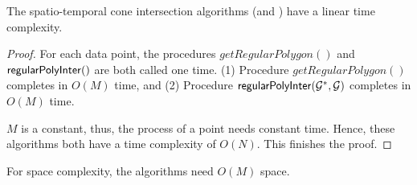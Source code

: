 \begin{theorem}
\label{prop-cist-complexity}
The spatio-temporal cone intersection algorithms (\cist and \cista) have a linear time complexity.
\end{theorem}

\begin{proof}
For each data point, the procedures $getRegularPolygon()$ and ${\mathsf{regularPolyInter}}()$ are both called one time.
(1) Procedure $getRegularPolygon()$ completes in $O(M)$ time, and
(2) Procedure ${\mathsf{regularPolyInter}}(\mathcal{G}^*, \mathcal{G})$ completes in $O(M)$ time.

$M$ is a constant, thus, the process of a point needs constant time. Hence, these algorithms both have a time complexity of $O(N)$.
This finishes the proof.
\end{proof}


{For space complexity, the algorithms need $O(M)$ space.}
